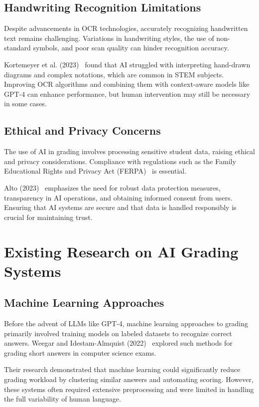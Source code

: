 \documentclass[ms,twoside,print]{nuthesis}
\begin{document}
\subsection{Handwriting Recognition Limitations}

Despite advancements in OCR technologies, accurately recognizing handwritten text remains challenging. Variations in handwriting styles, the use of non-standard symbols, and poor scan quality can hinder recognition accuracy.

Kortemeyer et al. (2023)~\cite{Kortemeyer2023b} found that AI struggled with interpreting hand-drawn diagrams and complex notations, which are common in STEM subjects. Improving OCR algorithms and combining them with context-aware models like GPT-4 can enhance performance, but human intervention may still be necessary in some cases.

\subsection{Ethical and Privacy Concerns}

The use of AI in grading involves processing sensitive student data, raising ethical and privacy considerations. Compliance with regulations such as the Family Educational Rights and Privacy Act (FERPA)~\cite{ferpa} is essential.

Alto (2023)~\cite{Alto2023} emphasizes the need for robust data protection measures, transparency in AI operations, and obtaining informed consent from users. Ensuring that AI systems are secure and that data is handled responsibly is crucial for maintaining trust.

\section{Existing Research on AI Grading Systems}

\subsection{Machine Learning Approaches}

Before the advent of LLMs like GPT-4, machine learning approaches to grading primarily involved training models on labeled datasets to recognize correct answers. Weegar and Idestam-Almquist (2022)~\cite{Weegar2022} explored such methods for grading short answers in computer science exams.

Their research demonstrated that machine learning could significantly reduce grading workload by clustering similar answers and automating scoring. However, these systems often required extensive preprocessing and were limited in handling the full variability of human language.
\end{document}
